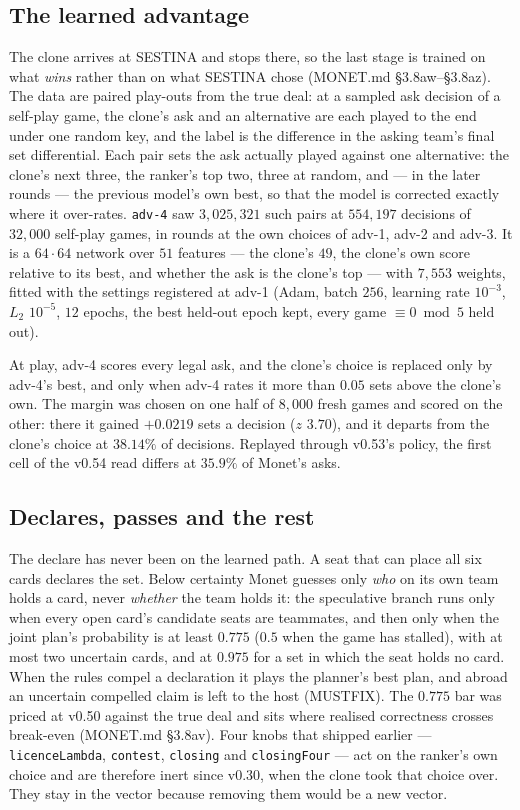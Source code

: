\documentclass[11pt]{article}
\newcommand{\code}[1]{\texttt{#1}}
\newcommand{\monet}{MONET.md}
\newcommand{\sect}[1]{\S#1}
\begin{document}
\subsection{The learned advantage}

The clone arrives at SESTINA and stops there, so the last stage is trained on what \emph{wins} rather
than on what SESTINA chose (\monet{} \sect{3.8aw}--\sect{3.8az}). The data are paired play-outs from
the true deal: at a sampled ask decision of a self-play game, the clone's ask and an alternative are
each played to the end under one random key, and the label is the difference in the asking team's
final set differential. Each pair sets the ask actually played against one alternative: the
clone's next three, the ranker's top two, three at random, and --- in the later rounds --- the previous
model's own best, so that the model is corrected exactly where it over-rates. \code{adv-4} saw $3{,}025{,}321$ such pairs
at $554{,}197$ decisions of $32{,}000$ self-play games, in rounds at the own choices of adv-1, adv-2 and
adv-3. It is a $64\cdot64$ network over $51$ features --- the clone's $49$, the clone's own score
relative to its best, and whether the ask is the clone's top --- with $7{,}553$ weights, fitted with the
settings registered at adv-1 (Adam, batch $256$, learning rate $10^{-3}$, $L_2$ $10^{-5}$, $12$ epochs,
the best held-out epoch kept, every game $\equiv 0 \bmod 5$ held out).

At play, adv-4 scores every legal ask, and the clone's choice is replaced only by adv-4's best, and only
when adv-4 rates it more than $0.05$ sets above the clone's own. The margin was chosen on one half of
$8{,}000$ fresh games and scored on the other: there it gained $+0.0219$ sets a decision ($z$ $3.70$),
and it departs from the clone's choice at $38.14\%$ of decisions. Replayed through v0.53's policy, the first
cell of the v0.54 read differs at $35.9\%$ of Monet's asks.

\subsection{Declares, passes and the rest}

The declare has never been on the learned path. A seat that can place all six cards declares the set.
Below certainty Monet guesses only \emph{who} on its own team holds a card, never \emph{whether} the
team holds it: the speculative branch runs only when every open card's candidate seats are teammates,
and then only when the joint plan's probability is at least $0.775$ ($0.5$ when the game has stalled),
with at most two uncertain cards, and at $0.975$ for a set in which the seat holds no card.
When the rules compel a declaration it plays the planner's best plan, and abroad an uncertain compelled
claim is left to the host (MUSTFIX). The $0.775$ bar was priced at v0.50 against the true deal and sits
where realised correctness crosses break-even (\monet{} \sect{3.8av}). Four knobs that shipped earlier
--- \code{licenceLambda}, \code{contest}, \code{closing} and \code{closingFour} --- act on the ranker's
own choice and are therefore inert since v0.30, when the clone took that choice over. They stay in the
vector because removing them would be a new vector.
\end{document}
